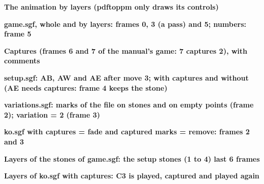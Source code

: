 \documentclass{article}
\newcommand\case[1]{\par\medskip\noindent\textbf{#1}\par\nopagebreak}
\begin{document}

\case{The animation by layers (pdftoppm only draws its controls)}

\case{game.sgf, whole and by layers: frames 0, 3 (a pass) and 5; numbers: frame 5}


\case{Captures (frames 6 and 7 of the manual's game: 7 captures 2), with comments}

\case{setup.sgf: AB, AW and AE after move 3; with captures and without (AE needs captures: frame 4 keeps the stone)}


\case{variations.sgf: marks of the file on stones and on empty points (frame 2); variation = 2 (frame 3)}


\case{ko.sgf with captures = fade and captured marks = remove: frames 2 and 3}

\case{Layers of the stones of game.sgf: the setup stones (1 to 4) last 6 frames}

\case{Layers of ko.sgf with captures: C3 is played, captured and played again}

\end{document}
